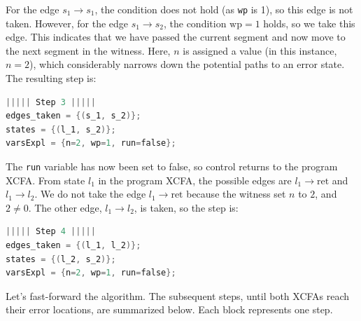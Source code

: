 For the edge $s_1 \to s_1$, the condition does not hold (as \texttt{wp} is 1), so this edge is not taken.
However, for the edge $s_1 \to s_2$, the condition $\text{wp}=1$ holds, so we take this edge.
This indicates that we have passed the current segment and now move to the next segment in the witness.
Here, $n$ is assigned a value (in this instance, $n=2$), which considerably narrows down the potential paths to an error state.
The resulting step is:
\begin{lstlisting}[style=C, language=C, basicstyle=\ttfamily\footnotesize, columns=flexible,
    breaklines=true, breakatwhitespace=true, tabsize=2, showstringspaces=false]
||||| Step 3 |||||
edges_taken = {(s_1, s_2)};
states = {(l_1, s_2)}; 
varsExpl = {n=2, wp=1, run=false}; 
\end{lstlisting}
The \texttt{run} variable has now been set to false, so control returns to the program XCFA.
From state $l_1$ in the program XCFA, the possible edges are $l_1 \to \text{ret}$ and $l_1 \to l_2$.
We do not take the edge $l_1 \to \text{ret}$ because the witness set $n$ to $2$, and $2 \neq 0$.
The other edge, $l_1 \to l_2$, is taken, so the step is:
\begin{lstlisting}[style=C, language=C, basicstyle=\ttfamily\footnotesize, columns=flexible,
    breaklines=true, breakatwhitespace=true, tabsize=2, showstringspaces=false]
||||| Step 4 |||||
edges_taken = {(l_1, l_2)};
states = {(l_2, s_2)}; 
varsExpl = {n=2, wp=1, run=false}; 
\end{lstlisting}
Let's fast-forward the algorithm. The subsequent steps, until both XCFAs reach their error
locations, are summarized below. Each block represents one step.

